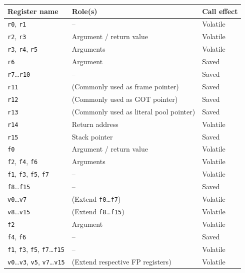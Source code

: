 \documentclass[USenglish,fontsize=11pt,twoside,%
  toc=bib,toc=idx,toc=graduated,numbers=noendperiod,
  bookmarks=true,
  bookmarksnumbered=true,
  bookmarksopen=true,
  bookmarksopenlevel=1,
  breaklinks=true,
  colorlinks=true,
  linkcolor=black,
  pdfpagelayout={TwoPageRight},
  pdfusetitle=true
]{scrreprt}
\newenvironment{DIFnomarkup}{}{} %
\begin{document}
\begin{table}
  \centering
  \begin{DIFnomarkup}
  \begin{threeparttable}
    \begin{tabularx}{\textwidth}{lXl}
      \toprule
      Register name & Role(s) & Call effect\tnote{\dagger} \\
      \midrule
      \texttt{r0}, \texttt{r1} & -- & Volatile \\
      \texttt{r2}{\ifzseries\else , \texttt{r3}\fi}&
      Argument / return value & Volatile \\
      {\ifzseries\texttt{r3}, \fi}\texttt{r4}, \texttt{r5} &
      Arguments & Volatile \\
      \texttt{r6} & Argument & Saved \\
      \texttt{r7}…\texttt{r10} & -- & Saved \\
      \texttt{r11} & (Commonly used as frame pointer) & Saved \\
      \texttt{r12} & (Commonly used as GOT pointer) & Saved \\
      \texttt{r13} & (Commonly used as literal pool pointer) & Saved \\
      \texttt{r14} & Return address & Volatile \\
      \texttt{r15} & Stack pointer & Saved \\
      \texttt{f0} & Argument / return value & Volatile \\
      \ifzseries %
      \texttt{f2}, \texttt{f4}, \texttt{f6} & Arguments & Volatile \\
      \texttt{f1}, \texttt{f3}, \texttt{f5}, \texttt{f7} & -- & Volatile \\
      \texttt{f8}…\texttt{f15} & -- & Saved \\
      \texttt{v0}…\texttt{v7} & (Extend \texttt{f0}…\texttt{f7}) & Volatile \\
      \texttt{v8}…\texttt{v15} & (Extend \texttt{f8}…\texttt{f15}) &
      Volatile\tnote{\ddagger} \\
      \else %
      \texttt{f2} & Argument & Volatile \\
      \texttt{f4}, \texttt{f6} & -- & Saved \\
      \texttt{f1}, \texttt{f3}, \texttt{f5}, \texttt{f7}…\texttt{f15} &
      -- & Volatile \\
      \texttt{v0}…\texttt{v3}, \texttt{v5}, \texttt{v7}…\texttt{v15} &
      (Extend respective FP registers) & Volatile \\

\end{tabularx}
\end{threeparttable}
\end{DIFnomarkup}
\end{table}
\end{document}
